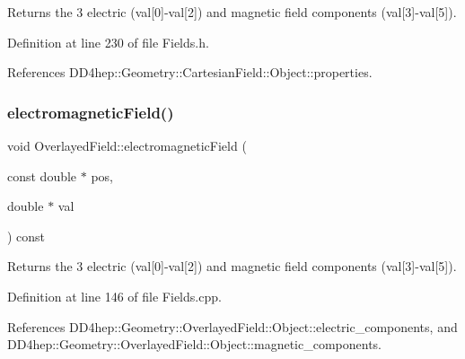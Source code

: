 Returns the 3 electric (val\mbox{[}0\mbox{]}-\/val\mbox{[}2\mbox{]}) and magnetic field components (val\mbox{[}3\mbox{]}-\/val\mbox{[}5\mbox{]}). 



Definition at line 230 of file Fields.\+h.



References D\+D4hep\+::\+Geometry\+::\+Cartesian\+Field\+::\+Object\+::properties.

\hypertarget{class_d_d4hep_1_1_geometry_1_1_overlayed_field_a8b9cc4d26ec79890f5495b34f9de47c5}{}\label{class_d_d4hep_1_1_geometry_1_1_overlayed_field_a8b9cc4d26ec79890f5495b34f9de47c5} 
\subsubsection{\texorpdfstring{electromagnetic\+Field()}{electromagneticField()}\hspace{0.1cm}{\footnotesize\ttfamily [2/2]}}
{\footnotesize\ttfamily void Overlayed\+Field\+::electromagnetic\+Field (\begin{DoxyParamCaption}\item[{const double $\ast$}]{pos,  }\item[{double $\ast$}]{val }\end{DoxyParamCaption}) const}



Returns the 3 electric (val\mbox{[}0\mbox{]}-\/val\mbox{[}2\mbox{]}) and magnetic field components (val\mbox{[}3\mbox{]}-\/val\mbox{[}5\mbox{]}). 



Definition at line 146 of file Fields.\+cpp.



References D\+D4hep\+::\+Geometry\+::\+Overlayed\+Field\+::\+Object\+::electric\+\_\+components, and D\+D4hep\+::\+Geometry\+::\+Overlayed\+Field\+::\+Object\+::magnetic\+\_\+components.

\hypertarget{class_d_d4hep_1_1_geometry_1_1_overlayed_field_aa89c3f5aa4ab97881e0d9c68c9eeff62}{}\label{class_d_d4hep_1_1_geometry_1_1_overlayed_field_aa89c3f5aa4ab97881e0d9c68c9eeff62} 
